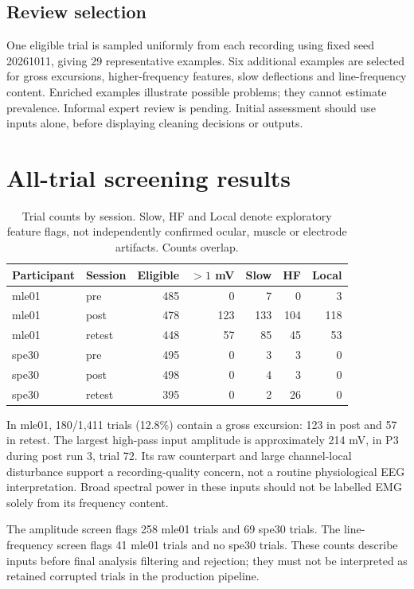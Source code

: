 \documentclass[11pt,a4paper]{article}
\begin{document}
\subsection{Review selection}
One eligible trial is sampled uniformly from each recording using fixed seed 20261011, giving 29 representative examples. Six additional examples are selected for gross excursions, higher-frequency features, slow deflections and line-frequency content. Enriched examples illustrate possible problems; they cannot estimate prevalence. Informal expert review is pending. Initial assessment should use inputs alone, before displaying cleaning decisions or outputs.
\section{All-trial screening results}
\begin{table}[H]\centering\small
\begin{tabular}{llrrrrr}\toprule
Participant & Session & Eligible & $>1$ mV & Slow & HF & Local\\\midrule
mle01 & pre & 485 & 0 & 7 & 0 & 3 \\
mle01 & post & 478 & 123 & 133 & 104 & 118 \\
mle01 & retest & 448 & 57 & 85 & 45 & 53 \\
spe30 & pre & 495 & 0 & 3 & 3 & 0 \\
spe30 & post & 498 & 0 & 4 & 3 & 0 \\
spe30 & retest & 395 & 0 & 2 & 26 & 0 \\
\bottomrule\end{tabular}
\caption{Trial counts by session. Slow, HF and Local denote exploratory feature flags, not independently confirmed ocular, muscle or electrode artifacts. Counts overlap.}\end{table}

In mle01, 180/1,411 trials (12.8\%) contain a gross excursion: 123 in post and 57 in retest. The largest high-pass input amplitude is approximately 214 mV, in P3 during post run 3, trial 72. Its raw counterpart and large channel-local disturbance support a recording-quality concern, not a routine physiological EEG interpretation. Broad spectral power in these inputs should not be labelled EMG solely from its frequency content.

The amplitude screen flags 258 mle01 trials and 69 spe30 trials. The line-frequency screen flags 41 mle01 trials and no spe30 trials. These counts describe inputs before final analysis filtering and rejection; they must not be interpreted as retained corrupted trials in the production pipeline.
\end{document}
